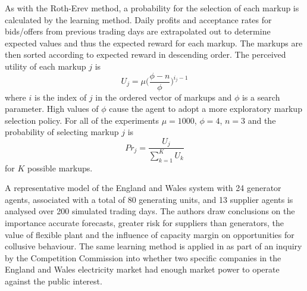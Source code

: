 As with the Roth-Erev method, a probability for the selection of each markup is
calculated by the learning method.  Daily profits and acceptance rates for
bids/offers from previous trading days are extrapolated out to determine
expected values and thus the expected reward for each markup.  The markups are then
sorted according to expected reward in descending order.  The perceived utility
of each markup $j$ is
\begin{equation}
U_j = \mu \biggl(\frac{\phi - n}{\phi}\biggr)^{i_j-1}
\end{equation}
where $i$ is the index of $j$ in the ordered vector of markups and $\phi$ is a
search parameter.  High values of $\phi$ cause the agent to adopt a more
exploratory markup selection policy.  For all of the experiments $\mu = 1000$,
$\phi = 4$, $n = 3$ and the probability of selecting markup $j$ is
\begin{equation}
Pr_j = \frac{U_j}{\sum_{k=1}^K U_k}
\end{equation}
for $K$ possible markups.

A representative model of the England and Wales system with 24 generator
agents, associated with a total of 80 generating units, and 13 supplier agents
is analysed over 200 simulated trading days.  The authors draw conclusions on
the importance accurate forecasts, greater risk for suppliers than generators, the
value of flexible plant and the influence of capacity margin on opportunities
for collusive behaviour.
The same learning method is applied in  as part of an
inquiry by the Competition Commission into whether two specific companies in the
England and Wales electricity market had enough market power to operate against
the public interest.

